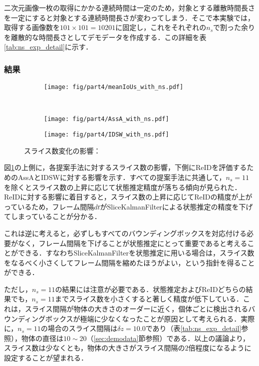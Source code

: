     二次元画像一枚の取得にかかる連続時間は一定のため，対象とする離散時間長さを一定にすると対象とする連続時間長さが変わってしまう．そこで本実験では，取得する画像数を$101 \times 101 = 10201$に固定し，これをそれぞれの$n_s$で割った余りを離散的な時間長さとしてデモデータを作成する．この詳細を表\ref{tab:ns_exp_detail}に示す．

    \subsubsection{結果}

    \begin{figure}[t]
        \begin{subfigure}[t]{\linewidth}
            \centering
            \texttt{[image: fig/part4/meanIoUs\_with\_ns.pdf]}
        \end{subfigure}
        \\
        \begin{subfigure}[t]{.5\linewidth}
            \centering
            \texttt{[image: fig/part4/AssA\_with\_ns.pdf]}
        \end{subfigure}
        \begin{subfigure}[t]{.5\linewidth}
            \centering
            \texttt{[image: fig/part4/IDSW\_with\_ns.pdf]}
        \end{subfigure}
        \caption[スライス数変化の影響]{スライス数変化の影響：}
        \label{fig:ns_effect}
    \end{figure}

    図\ref{fig:ns_effect}の上側に，各提案手法に対するスライス数の影響，下側にReIDを評価するためのAssAとIDSWに対する影響を示す．すべての提案手法に共通して，$n_s = 11$を除くとスライス数の上昇に応じて状態推定精度が落ちる傾向が見られた．ReIDに対する影響に着目すると，スライス数の上昇に応じてReIDの精度が上がっているため，フレーム間隔$dt$がSliceKalmanFilterによる状態推定の精度を下げてしまっていることが分かる．

    これは逆に考えると，必ずしもすべてのバウンディングボックスを対応付ける必要がなく，フレーム間隔を下げることが状態推定にとって重要であると考えることができる．すなわちSliceKalmanFilterを状態推定に用いる場合は，スライス数をなるべく小さくしてフレーム間隔を縮めたほうがよい，という指針を得ることができる．

    ただし，$n_s = 11$の結果には注意が必要である．状態推定およびReIDどちらの結果でも，$n_s = 11$までスライス数を小さくすると著しく精度が低下している．これは，スライス間隔が物体の大きさのオーダーに近く，個体ごとに検出されるバウンディングボックスが極端に少なくなったことが原因として考えられる．実際に，$n_s = 11$の場合のスライス間隔は$\delta z = 10.0$であり（表\ref{tab:ns_exp_detail}参照），物体の直径は$10 \sim 20$（\ref{sec:demodata}節参照）である．以上の議論より，スライス数は少なくとも，物体の大きさがスライス間隔の$2$倍程度になるように設定することが望まれる．

